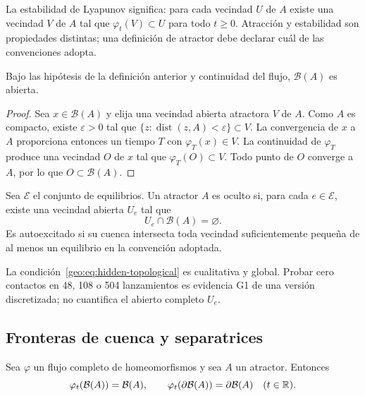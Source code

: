 La estabilidad de Lyapunov significa: para cada vecindad \(U\) de \(A\)
existe una vecindad \(V\) de \(A\) tal que
\(\varphi_t(V)\subset U\) para todo \(t\ge0\). Atracción y estabilidad son
propiedades distintas; una definición de atractor debe declarar cuál de las
convenciones adopta.

\begin{proposition}
Bajo las hipótesis de la definición anterior y continuidad del flujo,
\(\mathcal B(A)\) es abierta.
\end{proposition}

\begin{proof}
Sea \(x\in\mathcal B(A)\) y elija una vecindad abierta atractora \(V\)
de \(A\). Como \(A\) es compacto, existe \(\varepsilon>0\) tal que
\(\{z:\operatorname{dist}(z,A)<\varepsilon\}\subset V\).
La convergencia de \(x\) a \(A\) proporciona entonces un tiempo
\(T\) con \(\varphi_T(x)\in V\). La continuidad de
\(\varphi_T\) produce una vecindad \(O\) de \(x\) tal que
\(\varphi_T(O)\subset V\). Todo punto de \(O\) converge a \(A\), por lo que
\(O\subset\mathcal B(A)\).
\end{proof}

\begin{definition}
Sea \(\mathcal E\) el conjunto de equilibrios. Un atractor \(A\) es oculto si,
para cada \(e\in\mathcal E\), existe una vecindad abierta \(U_e\) tal que
\begin{equation}
 U_e\cap\mathcal B(A)=\varnothing.
 \label{geo:eq:hidden-topological}
\end{equation}
Es autoexcitado si su cuenca intersecta toda vecindad suficientemente pequeña
de al menos un equilibrio en la convención adoptada.
\end{definition}

La condición~\eqref{geo:eq:hidden-topological} es cualitativa y global. Probar
cero contactos en 48, 108 o 504 lanzamientos es evidencia G1 de una versión
discretizada; no cuantifica el abierto completo \(U_e\).

\subsection{Fronteras de cuenca y separatrices}

\begin{proposition}
Sea \(\varphi\) un flujo completo de homeomorfismos y sea \(A\) un atractor.
Entonces
\begin{equation}
 \varphi_t(\mathcal B(A))=\mathcal B(A),\qquad
 \varphi_t(\partial\mathcal B(A))=\partial\mathcal B(A)
 \quad(t\in\mathbb{R}).
 \label{geo:eq:basin-boundary-invariance}
\end{equation}
\end{proposition}

